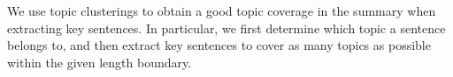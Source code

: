 \documentclass[a4paper,twoside]{article}
\begin{document}





\begin{comment}
Recent methods used sentence compression to convert a sentence into a shorter sentence or phrase, while trying to maintain syntactic correctness. For example, Turner and Charniak ~\shortcite{Turner:05} used a language model to trim sentences. Vandegehinste and
Pan ~\shortcite{Vandeghinste:04} used context-free grammar (CFG) trees to compress a sentence. However, CFG is ambiguous and constructing CFG trees' complexity is high. Dependency trees are widely developed because they offer better syntactic representations of sentences ~\cite{kahane:12}. To increase the expressive capacity of our model, we apply compression of the selected individual sentence from a syntactic aspect with the dependency tree compression model ~\cite{Shao:16}. This model defines the set of empirical rules to specify what can and cannot be trimmed. These rules were formed based on experiences from working with a large number of text documents. It showed that this model can be used to generate titles which have higher F1 scores than those generated by the previous methods.
\end{comment}

We use topic clusterings to obtain a good topic coverage in the summary when extracting key sentences.
In particular, we first determine which topic a sentence belongs to,
and then %
extract key sentences to cover as many topics as possible within the given length boundary.
\end{document}
